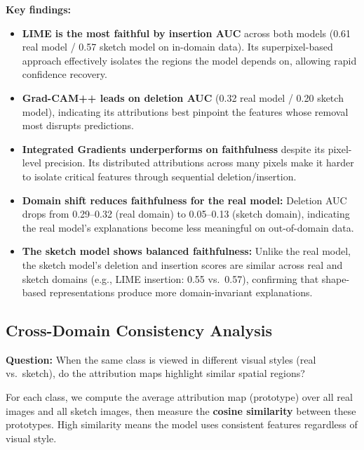 \documentclass[12pt, a4paper]{article}
\begin{document}
\textbf{Key findings:}
\begin{itemize}[leftmargin=*]
    \item \textbf{LIME is the most faithful by insertion AUC} across both models
          (0.61 real model / 0.57 sketch model on in-domain data).  Its
          superpixel-based approach effectively isolates the regions the model
          depends on, allowing rapid confidence recovery.
    \item \textbf{Grad-CAM++ leads on deletion AUC} (0.32 real model / 0.20
          sketch model), indicating its attributions best pinpoint the features
          whose removal most disrupts predictions.
    \item \textbf{Integrated Gradients underperforms on faithfulness} despite
          its pixel-level precision.  Its distributed attributions across many
          pixels make it harder to isolate critical features through sequential
          deletion/insertion.
    \item \textbf{Domain shift reduces faithfulness for the real model:}
          Deletion AUC drops from 0.29--0.32 (real domain) to 0.05--0.13
          (sketch domain), indicating the real model's explanations become less
          meaningful on out-of-domain data.
    \item \textbf{The sketch model shows balanced faithfulness:} Unlike the
          real model, the sketch model's deletion and insertion scores are
          similar across real and sketch domains (e.g., LIME insertion: 0.55
          vs.\ 0.57), confirming that shape-based representations produce
          more domain-invariant explanations.
\end{itemize}


\subsection{Cross-Domain Consistency Analysis}
\label{sec:cross_domain}

\textbf{Question:} When the same class is viewed in different visual styles
(real vs.\ sketch), do the attribution maps highlight similar spatial regions?

For each class, we compute the average attribution map (prototype) over all
real images and all sketch images, then measure the \textbf{cosine similarity}
between these prototypes.  High similarity means the model uses consistent
features regardless of visual style.
\end{document}
